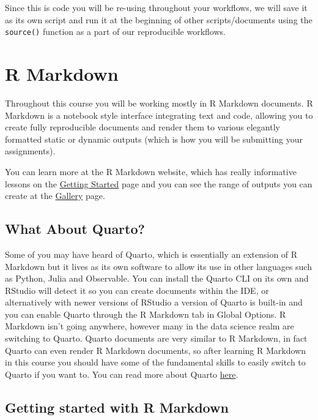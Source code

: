 \documentclass[
]{book}
\begin{document}
Since this is code you will be re-using throughout your workflows, we will save it as its own script and run it at the beginning of other scripts/documents using the \texttt{source()} function as a part of our reproducible workflows.

\hypertarget{r-markdown}{%
\section{R Markdown}\label{r-markdown}}

Throughout this course you will be working mostly in R Markdown documents. R Markdown is a notebook style interface integrating text and code, allowing you to create fully reproducible documents and render them to various elegantly formatted static or dynamic outputs (which is how you will be submitting your assignments).

You can learn more at the R Markdown website, which has really informative lessons on the \href{https://rmarkdown.rstudio.com/lesson-1.html}{Getting Started} page and you can see the range of outputs you can create at the \href{https://rmarkdown.rstudio.com/gallery.html}{Gallery} page.

\hypertarget{what-about-quarto}{%
\subsection{What About Quarto?}\label{what-about-quarto}}

Some of you may have heard of Quarto, which is essentially an extension of R Markdown but it lives as its own software to allow its use in other languages such as Python, Julia and Observable. You can install the Quarto CLI on its own and RStudio will detect it so you can create documents within the IDE, or alternatively with newer versions of RStudio a version of Quarto is built-in and you can enable Quarto through the R Markdown tab in Global Options. R Markdown isn't going anywhere, however many in the data science realm are switching to Quarto. Quarto documents are very similar to R Markdown, in fact Quarto can even render R Markdown documents, so after learning R Markdown in this course you should have some of the fundamental skills to easily switch to Quarto if you want to. You can read more about Quarto \href{https://quarto.org/}{here}.

\hypertarget{getting-started-with-r-markdown}{%
\subsection{Getting started with R Markdown}\label{getting-started-with-r-markdown}}
\end{document}
